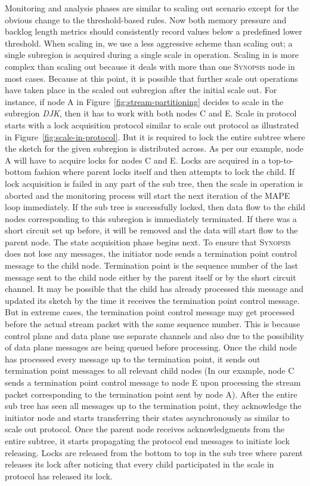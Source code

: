 Monitoring and analysis phases are similar to scaling out scenario except for the obvious change to the threshold-based rules.
Now both memory pressure and backlog length metrics should consistently record values below a predefined lower threshold.
When scaling in, we use a less aggressive scheme than scaling out; a single subregion is acquired during a single scale in operation.
Scaling in is more complex than scaling out because it deals with more than one \textsc{Synopsis} node in most cases.
Because at this point, it is possible that further scale out operations have taken place in the scaled out subregion after the initial scale out.
For instance, if node A in Figure~\ref{fig:stream-partitioning} decides to scale in the subregion \emph{DJK}, then it has to work with both nodes C and E.
Scale in protocol starts with a lock acquisition protocol similar to scale out protocol as illustrated in Figure~\ref{fig:scale-in-protocol}.
But it is required to lock the entire subtree where the sketch for the given subregion is distributed across.
As per our example, node A will have to acquire locks for nodes C and E.
Locks are acquired in a top-to-bottom fashion where parent locks itself and then attempts to lock the child.
If lock acquisition is failed in any part of the sub tree, then the scale in operation is aborted and the monitoring process will start the next iteration of the MAPE loop immediately.
If the sub tree is successfully locked, then data flow to the child nodes corresponding to this subregion is immediately terminated.
If there was a short circuit set up before, it will be removed and the data will start flow to the parent node.
The state acquisition phase begins next.
To ensure that \textsc{Synopsis} does not lose any messages, the initiator node sends a termination point control message to the child node.
Termination point is the sequence number of the last message sent to the child node either by the parent itself or by the short circuit channel.
It may be possible that the child has already processed this message and updated its sketch by the time it receives the termination point control message.
But in extreme cases, the termination point control message may get processed before the actual stream packet with the same sequence number.
This is because control plane and data plane use separate channels and also due to the possibility of data plane messages are being queued before processing.
Once the child node has processed every message up to the termination point, it sends out termination point messages to all relevant child nodes (In our example, node C sends a termination point control message to node E upon processing the stream packet corresponding to the termination point sent by node A).
After the entire sub tree has seen all messages up to the termination point, they acknowledge the initiator node and starts transferring their states asynchronously as similar to scale out protocol.
Once the parent node receives acknowledgments from the entire subtree, it starts propagating the protocol end messages to initiate lock releasing.
Locks are released from the bottom to top in the sub tree where parent releases its lock after noticing that every child participated in the scale in protocol has released its lock.

